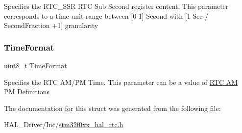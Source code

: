 Specifies the R\+T\+C\+\_\+\+S\+SR R\+TC Sub Second register content. This parameter corresponds to a time unit range between \mbox{[}0-\/1\mbox{]} Second with \mbox{[}1 Sec / Second\+Fraction +1\mbox{]} granularity \mbox{\label{struct_r_t_c___time_type_def_a7ca2cf99b14ee49dae5c787b2800f482}} 
\subsubsection{\texorpdfstring{Time\+Format}{TimeFormat}}
{\footnotesize\ttfamily uint8\+\_\+t Time\+Format}

Specifies the R\+TC A\+M/\+PM Time. This parameter can be a value of \hyperlink{group___r_t_c___a_m___p_m___definitions}{R\+TC AM PM Definitions} 

The documentation for this struct was generated from the following file\+:\begin{DoxyCompactItemize}
\item 
H\+A\+L\+\_\+\+Driver/\+Inc/\hyperlink{stm32f0xx__hal__rtc_8h}{stm32f0xx\+\_\+hal\+\_\+rtc.\+h}\end{DoxyCompactItemize}
